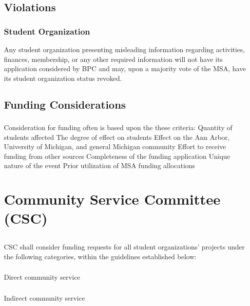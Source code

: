 \subsection{Violations}
\subsubsection{Student Organization}
\subsubsubsection{}
Any student organization presenting misleading information regarding activities, finances, membership, or any other required information will not have its application considered by BPC and may, upon a majority vote of the MSA, have its student organization status revoked.  

\subsection{Funding Considerations}
\subsubsection{}
Consideration for funding often is based upon the these criteria:
\subsubsubsection{}
Quantity of students affected 
\subsubsubsection{}
The degree of effect on students
\subsubsubsection{}
Effect on the Ann Arbor, University of Michigan, and general Michigan community
\subsubsubsection{}
Effort to receive funding from other sources
\subsubsubsection{}
Completeness of the funding application
\subsubsubsection{}
Unique nature of the event
\subsubsubsection{}
Prior utilization of MSA funding allocations


\section{Community Service Committee (CSC)}

\subsection{}
CSC shall consider funding requests for all student organizations' projects under the following categories, within the guidelines established below:
\subsubsection{}
Direct community service
\subsubsection{}
Indirect community service
